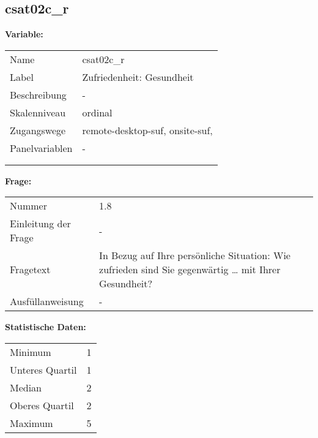 	
	
	\subsection{csat02c\_r}
	\label{subSection:csat02c_r}

	\noindent\textbf{Variable:}\\
		\begin{tabular}{lL{11.3cm}}
			\label{tableVariable:csat02c_r}
			Name & csat02c\_r \\
			Label & Zufriedenheit: Gesundheit \\
			Beschreibung & - \\
			Skalenniveau & ordinal \\
			Zugangswege &
				remote-desktop-suf,
				onsite-suf,
 \\
			Panelvariablen & -
			 \\
			 \\
 \\
		\end{tabular}

		\vspace*{1 cm}
		\noindent\textbf{Frage:}\\
		\begin{tabular}{lL{11.3cm}}
			\label{tableQuestion:csat02c_r}
			Nummer & 1.8 \\
			Einleitung der Frage & - \\
			Fragetext & In Bezug auf Ihre persönliche Situation: Wie zufrieden sind Sie gegenwärtig …
mit Ihrer Gesundheit? \\
			Ausfüllanweisung & - \\
		\end{tabular}


		\vspace*{1 cm}
		\noindent\textbf{Statistische Daten:}\\
			\begin{tabular}{ll}
				\label{tableStatistics:csat02c_r}
					Minimum & 1 \\
					Unteres Quartil & 1 \\
					Median & 2 \\
					Oberes Quartil & 2 \\
					Maximum & 5 \\
			\end{tabular}



